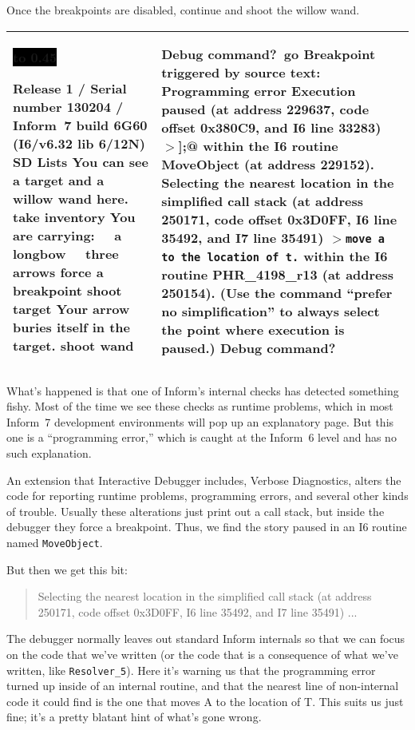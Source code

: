 \documentclass{book}
\newcommand{\n}{\hspace*{\fill}\newline}
\newcommand{\terp}[2]{\begin{center}\begin{tabular}{p{0.45\textwidth}|p{0.45\textwidth}}\midrule #1&#2\\\midrule\end{tabular}\end{center}}
\newcommand{\glkheading}[1]{\textbf{#1}}
\newcommand{\glkinput}[1]{\textbf{#1}}
\newcommand{\glkstatusline}[2]{\centerline{\colorbox{black}{\hbox to 0.45\textwidth{\textcolor{white}{#1\hfil #2}}}}}
\newcommand{\storyprompt}{\raisebox{1.5pt}{\(>\)}}
\newcommand{\cursor}{\raisebox{-1.5pt}{\RectangleThin}}
\newcommand{\markedindent}{\(>\)\qquad}
\begin{document}
Once the breakpoints are disabled, continue and shoot the willow wand.

\terp{\glkstatusline{Lists}{0/3}\n
  Release 1 / Serial number 130204 / Inform~7 build 6G60 (I6/v6.32 lib 6/12N) SD\n
  \n
  \glkheading{Lists}\n
  You can see a target and a willow wand here.\n
  \n
  \storyprompt\glkinput{take inventory}\n
  You are carrying:\n
  \null\ \ a longbow\n
  \null\ \ three arrows\n
  \n
  \storyprompt\glkinput{force a breakpoint}\n
  \storyprompt\glkinput{shoot target}\n
  Your arrow buries itself in the target.\n
  \n
  \storyprompt\glkinput{shoot wand}\n
  \n
  [** Programming error: tried to ``move'' arrow to nothing **]}{%
  Debug command?\ \glkinput{go}\n
  \n
  \glkheading{Breakpoint triggered by source text:} Programming error\n
  \n
  Execution paused (at address 229637, code offset 0x380C9, and I6 line 33283)\n
  \markedindent \lstinline@];@\n
  within the I6 routine MoveObject (at address 229152).\n
  \n
  Selecting the nearest location in the simplified call stack (at address 250171, code offset 0x3D0FF, I6 line 35492, and I7 line 35491)\n
  \markedindent \lstinline {move a to the location of t.}\n
  within the I6 routine PHR\_4198\_r13 (at address 250154).\n
  (Use the command ``prefer no simplification'' to always select the point where execution is paused.)\n
  \n
  Debug command?\ \cursor}

What's happened is that one of Inform's internal checks has detected something
fishy.  Most of the time we see these checks as runtime problems, which in most
Inform~7 development environments will pop up an explanatory page.  But this one
is a ``programming error,'' which is caught at the Inform~6 level and has no
such explanation.

An extension that Interactive Debugger includes, Verbose Diagnostics, alters the
code for reporting runtime problems, programming errors, and several other kinds
of trouble.  Usually these alterations just print out a call stack, but inside
the debugger they force a breakpoint.  Thus, we find the story paused in an I6
routine named \lstinline{MoveObject}.

But then we get this bit:

\begin{quote}
  Selecting the nearest location in the simplified call stack (at address 250171, code offset 0x3D0FF, I6 line 35492, and I7 line 35491) ...
\end{quote}

The debugger normally leaves out standard Inform internals so that we can focus
on the code that we've written (or the code that is a consequence of what we've
written, like \lstinline{Resolver_5}).  Here it's warning us that the
programming error turned up inside of an internal routine, and that the nearest
line of non-internal code it could find is the one that moves A to the location
of T.  This suits us just fine; it's a pretty blatant hint of what's gone wrong.
\end{document}

